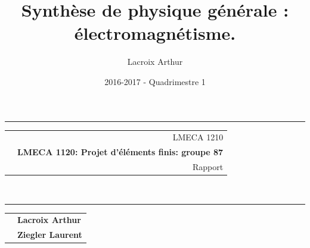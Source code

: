 \documentclass{article}
\title{\Huge{Synthèse de physique générale : électromagnétisme.}}
\author{Lacroix Arthur}
\date{2016-2017 - Quadrimestre 1}
\theoremstyle{definition}
\newlength{\deca}
\newcommand{\code}{LMECA 1210}
\newcommand{\cours}{LMECA 1120: Projet d'éléments finis: groupe 87}
\newcommand{\stitre}{Rapport}
\begin{document}
\begin{titlepage}
	\centering
	{\rule{15.8cm}{1mm}}\vspace{3mm}
	\begin{tabular}{p{\deca} r}
		& \code \vspace{1mm}\\
		& {\huge {\bf \cours}} \vspace{3mm}\\
		& {\huge \stitre}
	\end{tabular}\\
	\vspace{1mm}
	{\rule{15.8cm}{1mm}}
	
	\vspace{5cm}
	
	\begin{tabular}{p{8cm} l}
	
		& {\huge \bf Lacroix Arthur} \\
		& {\huge \bf Ziegler Laurent} \\
	
		
		
	\end{tabular}\\
	\vspace{5.5cm}
	

\end{titlepage}
\end{document}
